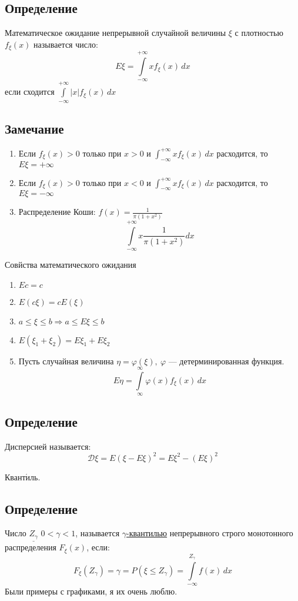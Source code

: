 \documentclass[12pt, a4paper]{article}
\begin{document}
    \subsection*{Определение}
    Математическое ожидание непрерывной случайной величины $\xi$ с плотностью $f_{\xi}(x)$ называется число:
    \[E\xi = \int\limits_{-\infty}^{+\infty} xf_{\xi}(x)\, dx\]
    если сходится $\displaystyle \int\limits_{-\infty}^{+\infty} |x| f_{\xi}(x)\, dx$
    \subsection*{Замечание}
    \begin{enumerate}
        \item Если $f_{\xi}(x) > 0$ только при $x > 0$ и $\displaystyle\int_{-\infty}^{+\infty} x f_{\xi}(x)\, dx$ расходится, то $E\xi = +\infty$
        \item Если $f_{\xi}(x) > 0$ только при $x < 0$ и $\displaystyle\int_{-\infty}^{+\infty} x f_{\xi}(x)\, dx$ расходится, то $E\xi = -\infty$
        \item Распределение Коши: $f(x) = \frac{1}{\pi(1 + x^2)}$
        \[\int\limits_{-\infty}^{+\infty} x \frac{1}{\pi(1 + x^2)} dx\]
    \end{enumerate}\newpage
    \begin{center}
        Совйства математического ожидания
    \end{center}
    \begin{enumerate}
        \item $Ec = c$
        \item $E(c\xi) = cE(\xi)$
        \item $a\leq \xi \leq b\Rightarrow a\leq E\xi \leq b$
        \item $E(\xi_1 + \xi_2) = E\xi_1 + E\xi_2$
        \item Пусть случайная величина $\eta = \varphi(\xi),\ \varphi$ --- детерминированная функция.
        \[E\eta = \int\limits_{\infty}^{\infty} \varphi(x) f_{\xi}(x)\, dx\]
    \end{enumerate}
    \subsection*{Определение}
    Дисперсией называется:
    \[\mathcal{D}\xi = E(\xi - E\xi)^2 = E\xi^2 - (E\xi)^2\]
    \begin{center}
        Квант$\acute{\text{и}}$ль.
    \end{center}
    \subsection*{Определение}   
    Число $\underline{Z_{\gamma}}$ $0 < \gamma < 1$, называется \underline{$\gamma$-квантилью} непрерывного строго монотонного распределения $F_{\xi}(x)$, если:
    \[F_{\xi}(Z_{\gamma}) = \gamma = P(\xi \leq Z_{\gamma}) = \int\limits_{-\infty}^{Z_{\gamma}} f(x)\, dx\]
    Были примеры с графиками, я их очень люблю.
\end{document}
